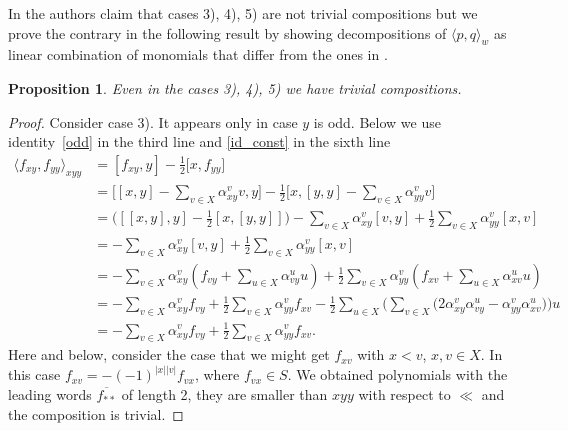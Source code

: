 \documentclass[12pt, reqno]{amsart}
\newtheorem{prop}[theorem]{Proposition}
\theoremstyle{remark}
\theoremstyle{definition}
\numberwithin{equation}{section}
\begin{document}
In \cite{L-P-Z} the authors claim that cases 3), 4), 5) are not trivial compositions but we prove the contrary in the following result by showing decompositions of $\langle p, q \rangle_w$ as linear combination of monomials that differ from the ones in \cite{L-P-Z}. 


\begin{prop}\label{Prop345}
 Even in the cases 3), 4), 5) we have trivial compositions.
\end{prop}
\begin{proof}

Consider case 3). It appears only in case $y$ is odd. 
Below we use identity~\eqref{odd} in the third line and \eqref{id_const} in the sixth line  
\begin{align*}
\langle f_{xy}, f_{yy}\rangle_{xyy} &= [f_{xy},y] -  \frac{1}{2} \Big[x, f_{yy}\Big] \\
&=\Big[[x,y] - \sum_{v \in X} \alpha_{xy}^v v, y\Big]- \frac 12\Big[x,  [y,y] - \sum_{v \in X} \alpha_{yy}^v v\Big]\\
&=\Big([[x,y],y]-\frac 12[x,[y,y]]\Big)
-\sum_{v \in X}\alpha_{xy}^v [  v, y]+  \frac 12\sum_{v \in X}\alpha_{yy}^v[x,   v]\\
& =
-\sum_{v \in X}\alpha_{xy}^v [  v, y]+  \frac 12\sum_{v \in X}\alpha_{yy}^v[x,   v]\\
&=-\sum_{v \in X}\alpha_{xy}^v (f_{vy} + \sum_{u\in X}\alpha_{vy}^u u )+  
    \frac 12\sum_{v \in X}\alpha_{yy}^v( f_{xv}  +\sum_{u\in X} \alpha_{xv}^u u)\\
&=-\sum_{v \in X}\alpha_{xy}^v f_{vy}+ \frac 12\sum_{v \in X}\alpha_{yy}^v f_{xv}
  - \frac 12 \sum_{u\in X} \Big(\sum_{v\in X}\Big(2\alpha_{xy}^v  \alpha_{vy}^u -\alpha_{yy}^v\alpha_{xv}^u \Big)\Big)u\\
&=-\sum_{v \in X}\alpha_{xy}^v f_{vy}+ \frac 12\sum_{v \in X}\alpha_{yy}^v f_{xv}.  
\end{align*} 
Here and below, consider the case  that we might get  $f_{xv}$ with $x<v$, $x,v\in X$.
In this case $f_{xv}=-(-1)^{|x||v|} f_{vx}$, where $f_{vx}\in S$.
We obtained polynomials with the leading words $\overline{f_{**}}$ of length 2, they are smaller than $xyy$  with respect to $\ll $ and the composition is trivial.




\end{proof}
\end{document}
